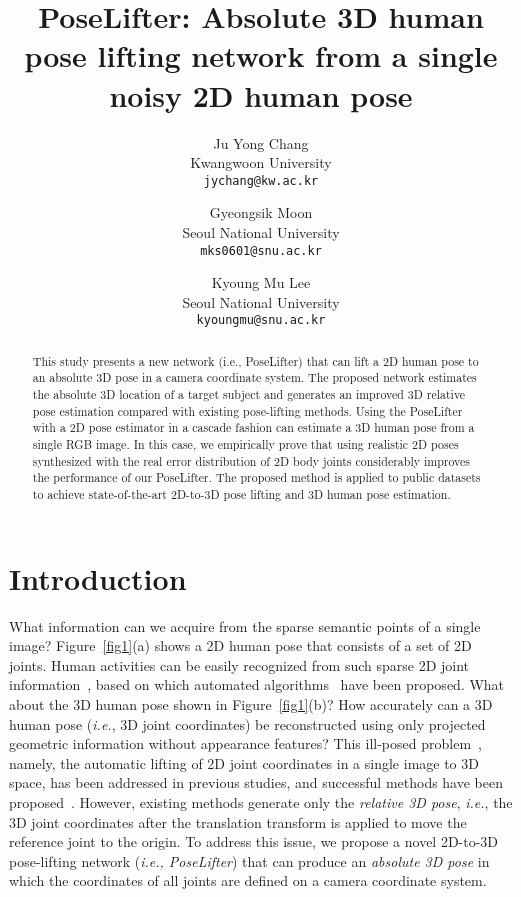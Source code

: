 \documentclass[10pt,twocolumn,letterpaper]{article}
\begin{document}
\title{PoseLifter: Absolute 3D human pose lifting network from a single noisy 2D human pose}

\author{Ju Yong Chang\\
Kwangwoon University\\
{\tt\small jychang@kw.ac.kr}
\and
Gyeongsik Moon\\
Seoul National University\\
{\tt\small mks0601@snu.ac.kr}
\and
Kyoung Mu Lee\\
Seoul National University\\
{\tt\small kyoungmu@snu.ac.kr}
}

\maketitle



\begin{abstract}
This study presents a new network (i.e., PoseLifter) that can lift a 2D human pose to an absolute 3D pose in a camera coordinate system. The proposed network estimates the absolute 3D location of a target subject and generates an improved 3D relative pose estimation compared with existing pose-lifting methods. Using the PoseLifter with a 2D pose estimator in a cascade fashion can estimate a 3D human pose from a single RGB image. In this case, we empirically prove that using realistic 2D poses synthesized with the real error distribution of 2D body joints considerably improves the performance of our PoseLifter. The proposed method is applied to public datasets to achieve state-of-the-art 2D-to-3D pose lifting and 3D human pose estimation.
\end{abstract}

\section{Introduction}
\label{sec1}

What information can we acquire from the sparse semantic points of a single image? Figure~\ref{fig1}(a) shows a 2D human pose that consists of a set of 2D joints. Human activities can be easily recognized from such sparse 2D joint information~\cite{Johansson1975}, based on which automated algorithms~\cite{Chang2016,Jhuang2013} have been proposed. What about the 3D human pose shown in Figure~\ref{fig1}(b)? How accurately can a 3D human pose (\textit{i.e.}, 3D joint coordinates) be reconstructed using only projected geometric information without appearance features? This ill-posed problem~\cite{Lee1985}, namely, the automatic lifting of 2D joint coordinates in a single image to 3D space, has been addressed in previous studies, and successful methods have been proposed~\cite{Martinez2017,Ramakrishna2012}. However, existing methods generate only the \textit{relative 3D pose}, \textit{i.e.}, the 3D joint coordinates after the translation transform is applied to move the reference joint to the origin. To address this issue, we propose a novel 2D-to-3D pose-lifting network (\textit{i.e., PoseLifter}) that can produce an \textit{absolute 3D pose} in which the coordinates of all joints are defined on a camera coordinate system.
\end{document}
